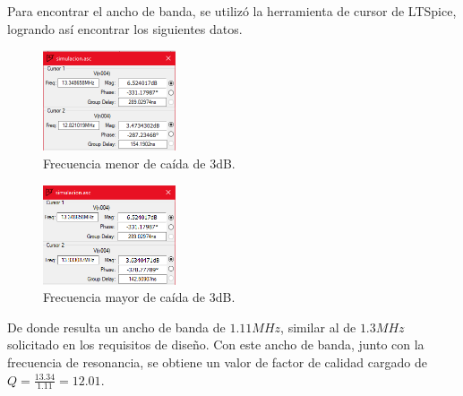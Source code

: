 \documentclass{article}
\begin{document}
\noindent Para encontrar el ancho de banda, se utilizó la herramienta de cursor de LTSpice, logrando así encontrar los siguientes datos.
\begin{figure}[H]
\centering
\includegraphics[width=0.35\textwidth]{./img/figura17.png}
\caption{Frecuencia menor de caída de 3dB.}
\label{fig:circuito17}
\end{figure}
\begin{figure}[H]
\centering
\includegraphics[width=0.35\textwidth]{./img/figura18.png}
\caption{Frecuencia mayor de caída de 3dB.}
\label{fig:circuito18}
\end{figure}
\noindent De donde resulta un ancho de banda de $1.11 MHz$, similar al de $1.3 MHz$ solicitado en los requisitos de diseño. Con este ancho de banda, junto con la frecuencia de resonancia, se obtiene un valor de factor de calidad cargado de $Q=\frac{13.34}{1.11}=12.01$.
\newpage
\end{document}
